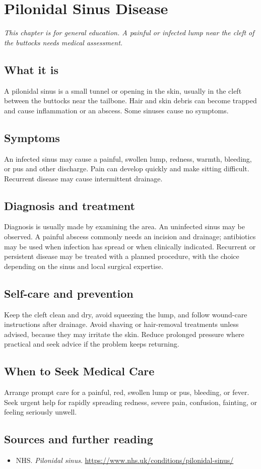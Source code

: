 \chapter{Pilonidal Sinus Disease}

\medskip
\noindent\textit{This chapter is for general education. A painful or infected lump near the cleft of the buttocks needs medical assessment.}

\section*{What it is}
A pilonidal sinus is a small tunnel or opening in the skin, usually in the cleft between the buttocks near the tailbone. Hair and skin debris can become trapped and cause inflammation or an abscess. Some sinuses cause no symptoms.

\section*{Symptoms}
An infected sinus may cause a painful, swollen lump, redness, warmth, bleeding, or pus and other discharge. Pain can develop quickly and make sitting difficult. Recurrent disease may cause intermittent drainage.

\section*{Diagnosis and treatment}
Diagnosis is usually made by examining the area. An uninfected sinus may be observed. A painful abscess commonly needs an incision and drainage; antibiotics may be used when infection has spread or when clinically indicated. Recurrent or persistent disease may be treated with a planned procedure, with the choice depending on the sinus and local surgical expertise.

\section*{Self-care and prevention}
Keep the cleft clean and dry, avoid squeezing the lump, and follow wound-care instructions after drainage. Avoid shaving or hair-removal treatments unless advised, because they may irritate the skin. Reduce prolonged pressure where practical and seek advice if the problem keeps returning.

\section*{When to Seek Medical Care}
Arrange prompt care for a painful, red, swollen lump or pus, bleeding, or fever. Seek urgent help for rapidly spreading redness, severe pain, confusion, fainting, or feeling seriously unwell.

\section*{Sources and further reading}
\begin{itemize}
\item NHS. \textit{Pilonidal sinus}. \url{https://www.nhs.uk/conditions/pilonidal-sinus/}
\end{itemize}
